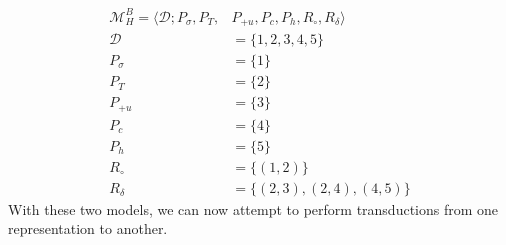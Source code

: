\documentclass{article}
\begin{document}
\begin{equation}
\begin{split}
\mathcal{M}^{B}_{H} = \langle \mathcal{D}; P_{\sigma}, P_{T}, &P_{+u}, P_{c}, P_{h}, R_{\circ}, R_{\delta} \rangle \\
\mathcal{D} &= \{1, 2, 3, 4, 5\} \\
P_{\sigma} &= \{1\} \\
P_{T} &= \{2\} \\
P_{+u} &= \{3\} \\
P_{c} &= \{4\} \\
P_{h} &= \{5\} \\
R_{\circ} &= \{(1,2)\} \\
R_{\delta} &= \{(2,3), (2,4), (4,5)\}
\end{split}
\end{equation}
With these two models, we can now attempt to perform transductions from one representation to another.
\end{document}
